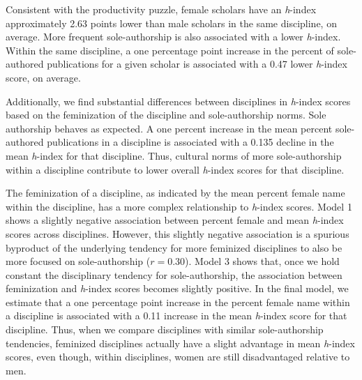\documentclass[
  10pt,
  letterpaper,
]{article}
\begin{document}
\begin{table}
{}

\end{table}%

Consistent with the productivity puzzle, female scholars have an
\emph{h}-index approximately 2.63 points lower than male scholars in the
same discipline, on average. More frequent sole-authorship is also
associated with a lower \emph{h}-index. Within the same discipline, a
one percentage point increase in the percent of sole-authored
publications for a given scholar is associated with a 0.47 lower
\emph{h}-index score, on average.

Additionally, we find substantial differences between disciplines in
\emph{h}-index scores based on the feminization of the discipline and
sole-authorship norms. Sole authorship behaves as expected. A one
percent increase in the mean percent sole-authored publications in a
discipline is associated with a 0.135 decline in the mean \emph{h}-index
for that discipline. Thus, cultural norms of more sole-authorship within
a discipline contribute to lower overall \emph{h}-index scores for that
discipline.

The feminization of a discipline, as indicated by the mean percent
female name within the discipline, has a more complex relationship to
\emph{h}-index scores. Model 1 shows a slightly negative association
between percent female and mean \emph{h}-index scores across
disciplines. However, this slightly negative association is a spurious
byproduct of the underlying tendency for more feminized disciplines to
also be more focused on sole-authorship (\(r=0.30\)). Model 3 shows
that, once we hold constant the disciplinary tendency for
sole-authorship, the association between feminization and \emph{h}-index
scores becomes slightly positive. In the final model, we estimate that a
one percentage point increase in the percent female name within a
discipline is associated with a 0.11 increase in the mean \emph{h}-index
score for that discipline. Thus, when we compare disciplines with
similar sole-authorship tendencies, feminized disciplines actually have
a slight advantage in mean \emph{h}-index scores, even though, within
disciplines, women are still disadvantaged relative to men.
\end{document}
